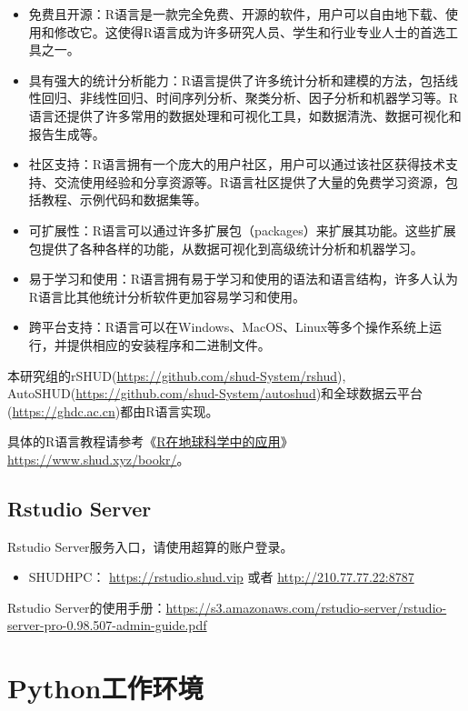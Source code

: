 \documentclass[
]{ctexbook}
\providecommand{\tightlist}{%
  \setlength{\itemsep}{0pt}\setlength{\parskip}{0pt}}
\begin{document}
\begin{itemize}
\item
  免费且开源：R语言是一款完全免费、开源的软件，用户可以自由地下载、使用和修改它。这使得R语言成为许多研究人员、学生和行业专业人士的首选工具之一。
\item
  具有强大的统计分析能力：R语言提供了许多统计分析和建模的方法，包括线性回归、非线性回归、时间序列分析、聚类分析、因子分析和机器学习等。R语言还提供了许多常用的数据处理和可视化工具，如数据清洗、数据可视化和报告生成等。
\item
  社区支持：R语言拥有一个庞大的用户社区，用户可以通过该社区获得技术支持、交流使用经验和分享资源等。R语言社区提供了大量的免费学习资源，包括教程、示例代码和数据集等。
\item
  可扩展性：R语言可以通过许多扩展包（packages）来扩展其功能。这些扩展包提供了各种各样的功能，从数据可视化到高级统计分析和机器学习。
\item
  易于学习和使用：R语言拥有易于学习和使用的语法和语言结构，许多人认为R语言比其他统计分析软件更加容易学习和使用。
\item
  跨平台支持：R语言可以在Windows、MacOS、Linux等多个操作系统上运行，并提供相应的安装程序和二进制文件。
\end{itemize}

本研究组的rSHUD(\url{https://github.com/shud-System/rshud}), AutoSHUD(\url{https://github.com/shud-System/autoshud})和全球数据云平台(\url{https://ghdc.ac.cn})都由R语言实现。

具体的R语言教程请参考《\href{https://www.shud.xyz/bookr/}{R在地球科学中的应用}》\url{https://www.shud.xyz/bookr/}。

\hypertarget{rstudio-server}{%
\subsection{Rstudio Server}\label{rstudio-server}}

Rstudio Server服务入口，请使用超算的账户登录。

\begin{itemize}
\tightlist
\item
  SHUDHPC： \url{https://rstudio.shud.vip} 或者 \url{http://210.77.77.22:8787}
\end{itemize}

Rstudio Server的使用手册：\url{https://s3.amazonaws.com/rstudio-server/rstudio-server-pro-0.98.507-admin-guide.pdf}

\hypertarget{python}{%
\section{Python工作环境}\label{python}}
\end{document}
